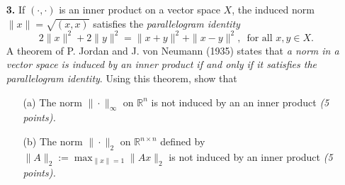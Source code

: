 \documentclass[10pt]{report}
\begin{document}
\begin{enumerate}
\item[\textbf{3.}] If $(\cdot,\cdot)$ is an inner product on a vector  space $X$, the induced norm $\|x\|= \sqrt{(x, x)}$ satisfies the \textit{parallelogram identity}
\[2 \|x\|^2 + 2\|y\|^2 = \|x+y\|^2 + \|x-y\|^2, \, \text{ for all } x,y \in X.\]
A theorem of P. Jordan and J. von Neumann (1935) states that \textit{a norm in a vector space is induced by an inner product if and only if it satisfies the parallelogram identity}. Using this theorem, show that
\begin{enumerate}
  \item[(a)] The norm $\|\cdot\|_{\infty}$ on $\mathbb{R}^n$ is not induced by an an inner product \textit{(5 points).}
  \item[(b)] The norm $\|\cdot\|_{2}$ on $\mathbb{R}^{n\times n}$ defined by $\|A\|_2:= \max_{\|x\|=1}\|Ax\|_2$ is not induced by an inner product \linebreak  \textit{(5 points).}
\end{enumerate}













\end{enumerate}
\end{document}
